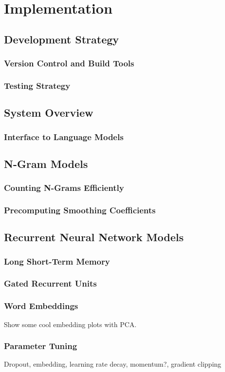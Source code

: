 \documentclass[a4paper, 12pt]{report}
\begin{document}
\chapter{Implementation}
\section{Development Strategy}
\subsection{Version Control and Build Tools}
\subsection{Testing Strategy}
\section{System Overview}
\subsection{Interface to Language Models}
\section{N-Gram Models}
\subsection{Counting N-Grams Efficiently}
\subsection{Precomputing Smoothing Coefficients}
\section{Recurrent Neural Network Models}
\subsection{Long Short-Term Memory}
\subsection{Gated Recurrent Units}
\subsection{Word Embeddings}
Show some cool embedding plots with PCA.
\subsection{Parameter Tuning}
Dropout, embedding, learning rate decay, momentum?, gradient clipping
\end{document}
